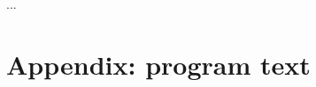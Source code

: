 \documentclass[a4paper]{article}
\begin{document}
...

\section{Appendix: program text}




%

%
\end{document}
